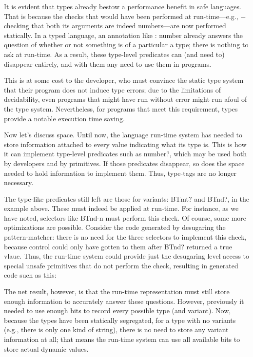 
It is evident that types already bestow a performance benefit in safe languages.
That is because the checks that would have been performed at run-time—e.g., +
checking that both its arguments are indeed numbers—are now performed
statically. In a typed language, an annotation like : number already answers the
question of whether or not something is of a particular a type; there is nothing
to ask at run-time. As a result, these type-level predicates can (and need to)
disappear entirely, and with them any need to use them in programs.

This is at some cost to the developer, who must convince the static type system
that their program does not induce type errors; due to the limitations of
decidability, even programs that might have run without error might run afoul of
the type system. Nevertheless, for programs that meet this requirement, types
provide a notable execution time saving.

Now let’s discuss space. Until now, the language run-time system has needed to
store information attached to every value indicating what its type is. This is
how it can implement type-level predicates such as number?, which may be used
both by developers and by primitives. If those predicates disappear, so does the
space needed to hold information to implement them. Thus, type-tags are no
longer necessary.

The type-like predicates still left are those for variants: BTmt? and BTnd?, in
the example above. These must indeed be applied at run-time. For instance, as we
have noted, selectors like BTnd-n must perform this check. Of course, some more
optimizations are possible. Consider the code generated by desugaring the
pattern-matcher: there is no need for the three selectors to implement this
check, because control could only have gotten to them after BTnd? returned a
true vlaue. Thus, the run-time system could provide just the desugaring level
access to special unsafe primitives that do not perform the check, resulting in
generated code such as this:

The net result, however, is that the run-time representation must still store
enough information to accurately answer these questions. However, previously it
needed to use enough bits to record every possible type (and variant). Now,
because the types have been statically segregated, for a type with no variants
(e.g., there is only one kind of string), there is no need to store any variant
information at all; that means the run-time system can use all available bits to
store actual dynamic values.

